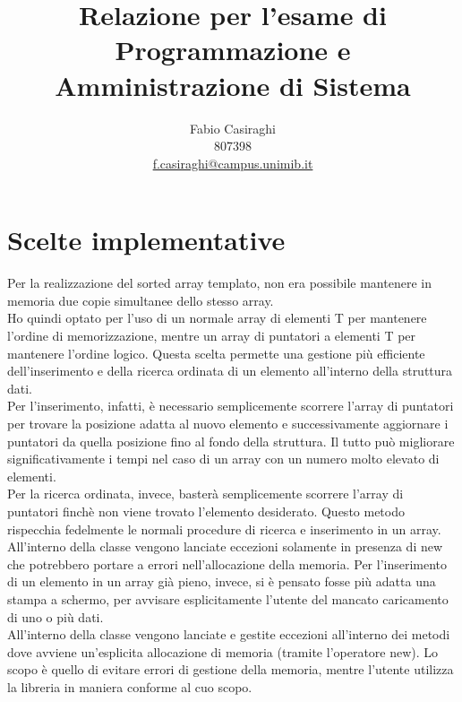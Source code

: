\documentclass[11pt]{article}
\author{Fabio Casiraghi \\807398 \\ \href{mailto:f.casiraghi@campus.unimib.it} {f.casiraghi@campus.unimib.it}}
\title{Relazione per l'esame di Programmazione e Amministrazione di Sistema}
\begin{document}
\maketitle
\vspace{2cm}

\section*{Scelte implementative}
Per la realizzazione del sorted array templato, non era possibile mantenere in memoria
due copie simultanee dello stesso array. \\
Ho quindi optato per l'uso di un normale array di elementi T per mantenere l'ordine di memorizzazione,
mentre un array di puntatori a elementi T per mantenere l'ordine logico. Questa scelta permette
una gestione più efficiente dell'inserimento e della ricerca ordinata di un elemento all'interno della
struttura dati.\\
Per l'inserimento, infatti, è necessario semplicemente scorrere l'array di puntatori per trovare la 
posizione adatta al nuovo elemento e successivamente aggiornare i puntatori da quella posizione fino al fondo
della struttura. Il tutto può migliorare significativamente i tempi nel caso di un array 
con un numero molto elevato di elementi.\\
Per la ricerca ordinata, invece, basterà semplicemente scorrere l'array di puntatori finchè non viene 
trovato l'elemento desiderato. Questo metodo rispecchia fedelmente le normali procedure di ricerca e inserimento 
in un array.\\
All'interno della classe vengono lanciate eccezioni solamente in presenza di new che potrebbero portare a 
errori nell'allocazione della memoria. Per l'inserimento di un elemento in un array già pieno, invece, si 
è pensato fosse più adatta una stampa a schermo, per avvisare esplicitamente l'utente del mancato caricamento di 
uno o più dati.\\
All'interno della classe vengono lanciate e gestite eccezioni all'interno dei metodi dove avviene un'esplicita allocazione di memoria (tramite l'operatore new). Lo scopo è quello di evitare errori di gestione della memoria, 
mentre l'utente utilizza la libreria in maniera conforme al cuo scopo.
\end{document}
